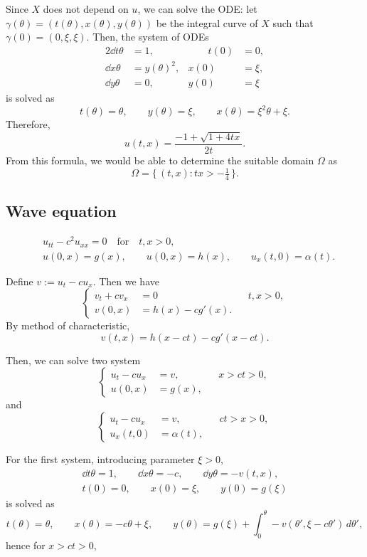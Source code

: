 \documentclass[12pt]{article}
\begin{document}
Since $X$ does not depend on $u$, we can solve the ODE: let $\gamma(\theta)=(t(\theta),x(\theta),y(\theta))$ be the integral curve of $X$ such that $\gamma(0)=(0,\xi,\xi)$.
Then, the system of ODEs
\begin{alignat*}{2}
\dd{t}{\theta}&=1,   &\qquad t(0)&=0,\\
\dd{x}{\theta}&=y(\theta)^2, & x(0)&=\xi,\\
\dd{y}{\theta}&=0,   & y(0)&=\xi
\end{alignat*}
is solved as
\[t(\theta)=\theta,\qquad y(\theta)=\xi,\qquad x(\theta)=\xi^2\theta+\xi.\]
Therefore,
\[u(t,x)=\frac{-1+\sqrt{1+4tx}}{2t}.\]
From this formula, we would be able to determine the suitable domain $\Omega$ as
\[\Omega=\{\,(t,x):tx>-\tfrac14\,\}.\]


\subsection{Wave equation}

\begin{align*}
&u_{tt}-c^2u_{xx}=0 \quad\text{for}\quad t,x>0, \\
&u(0,x)=g(x),\qquad u(0,x)=h(x),\qquad u_x(t,0)=\alpha(t).
\end{align*}

Define $v:=u_t-cu_x$.
Then we have
\[\left\{\begin{alignedat}{2}
v_t+cv_x &= 0 && t,x>0,\\
v(0,x) &= h(x)-cg'(x). &&
\end{alignedat}\right.\]
By method of characteristic,
\[v(t,x)=h(x-ct)-cg'(x-ct).\]

Then, we can solve two system
\[\left\{\begin{alignedat}{2}
u_t-cu_x &= v, && x>ct>0,\\
u(0,x) &= g(x), &&
\end{alignedat}\right.\]
and
\[\left\{\begin{alignedat}{2}
u_t-cu_x &= v, && ct>x>0,\\
u_x(t,0) &= \alpha(t), &&
\end{alignedat}\right.\]

For the first system, introducing parameter $\xi>0$,
\begin{gather*}
\dd{t}{\theta}=1,\qquad\dd{x}{\theta}=-c,\qquad\dd{y}{\theta}=-v(t,x),\\
t(0)=0,\qquad x(0)=\xi,\qquad y(0)=g(\xi)
\end{gather*}
is solved as
\[t(\theta)=\theta,\qquad x(\theta)=-c\theta+\xi,\qquad y(\theta)=g(\xi)+\int_0^\theta-v(\theta',\xi-c\theta')\,d\theta',\]
hence for $x>ct>0$,
\end{document}
